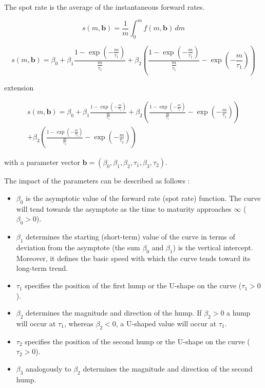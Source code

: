 The spot rate is the average of the instantaneous forward rates. 

\begin{equation}
  \label{eq:intspotrate}
  s(m,\bm{b})=\frac{1}{m}\int_0^mf(m,\bm{b})\,dm
\end{equation}


\begin{equation}
  \label{eq:nelson-spot}
   s(m,\bm{b}) = \beta_0 + \beta_1\frac{1-\exp(-\frac{m}{\tau_1})}{\frac{m}{\tau_1}} + \beta_2\left(\frac{1-\exp(-\frac{m}{\tau_1})}{\frac{m}{\tau_1}} - \exp(-\frac{m}{\tau_1})\right)
\end{equation}



%
 
\cite{Svensson1994} extension


\begin{multline}\label{eq:svensson-spot}
    s(m,\bm{b}) = \beta_0 + \beta_1\frac{1-\exp(-\frac{m}{\tau_1})}{\frac{m}{\tau_1}} + \beta_2\left(\frac{1-\exp(-\frac{m}{\tau_1})}{\frac{m}{\tau_1}} - \exp(-\frac{m}{\tau_1})\right) \\+ \beta_3\left(\frac{1-\exp(-\frac{m}{\tau_2})}{\frac{m}{\tau_2}} - \exp(-\frac{m}{\tau_2})\right)
\end{multline}



with a parameter vector ${\bm{b}} = \left(\beta_0,\beta_1,\beta_2,\tau_1,\beta_3,\tau_2\right)$.

The impact of the parameters can be described as follows \citep[see][p.7]{Bolder1999}:

\begin{itemize}
\item $\beta_0$ is the asymptotic value of the forward rate (spot rate) function.  The curve will tend towards the asymptote as the time to maturity approaches  $\infty$ ($\beta_0 >0$).
\item $\beta_1$ determines the starting (short-term) value of the curve in terms of deviation from the asymptote (the sum $\beta_0$ and $\beta_1$) is the vertical intercept. Moreover, it defines the basic speed with which the curve tends toward its long-term trend.
\item $\tau_1$ specifies the position of the first hump or the U-shape on the curve ($\tau_1>0$).
\item $\beta_2$ determines the magnitude and direction of the hump. If $\beta_2 >0$  a hump will occur at  $\tau_1$, whereas $\beta_2<0$, a U-shaped value will occur at $\tau_1$.
\item $\tau_2$ specifies the position of the second hump or the U-shape on the curve ($\tau_2>0$).
\item $\beta_3$ analogously  to  $\beta_2$ determines the magnitude and direction of the second hump.
\end{itemize}




